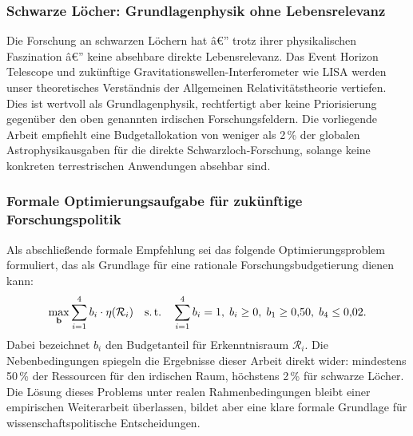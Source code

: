﻿\documentclass[a4paper,12pt]{article}
\theoremstyle{definition}
\begin{document}
\subsubsection{Schwarze Löcher: Grundlagenphysik ohne Lebensrelevanz}

Die Forschung an schwarzen Löchern hat â€” trotz ihrer physikalischen Faszination
â€” keine absehbare direkte Lebensrelevanz. Das Event Horizon Telescope und
zukünftige Gravitationswellen-Interferometer wie LISA werden unser theoretisches
Verständnis der Allgemeinen Relativitätstheorie vertiefen. Dies ist wertvoll als
Grundlagenphysik, rechtfertigt aber keine Priorisierung gegenüber den oben
genannten irdischen Forschungsfeldern. Die vorliegende Arbeit empfiehlt eine
Budgetallokation von weniger als 2\,\% der globalen Astrophysikausgaben für
die direkte Schwarzloch-Forschung, solange keine konkreten terrestrischen
Anwendungen absehbar sind.

\subsubsection{Formale Optimierungsaufgabe für zukünftige Forschungspolitik}

Als abschließende formale Empfehlung sei das folgende Optimierungsproblem
formuliert, das als Grundlage für eine rationale Forschungsbudgetierung dienen
kann:
\[
    \max_{\mathbf{b}} \sum_{i=1}^{4} b_i \cdot \eta(\mathcal{R}_i)
    \quad \text{s.\,t.} \quad
    \sum_{i=1}^{4} b_i = 1,\; b_i \geq 0,\; b_1 \geq 0{,}50,\; b_4 \leq 0{,}02.
\]
Dabei bezeichnet $b_i$ den Budgetanteil für Erkenntnisraum $\mathcal{R}_i$.
Die Nebenbedingungen spiegeln die Ergebnisse dieser Arbeit direkt wider:
mindestens 50\,\% der Ressourcen für den irdischen Raum, höchstens 2\,\% für
schwarze Löcher. Die Lösung dieses Problems unter realen Rahmenbedingungen
bleibt einer empirischen Weiterarbeit überlassen, bildet aber eine klare
formale Grundlage für wissenschaftspolitische Entscheidungen.
\end{document}

